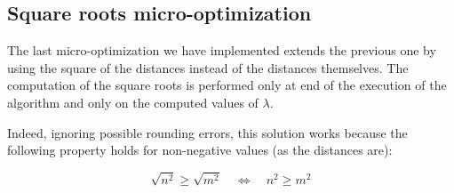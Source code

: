 \documentclass{article}
\begin{document}
\hypertarget{micro-optimization-no-square-root}{%
\subsection{Square roots micro-optimization}\label{micro-optimization-no-square-root}}

The last micro-optimization we have implemented extends the previous one by using the
square of the distances instead of the distances themselves. The computation of the square roots
is performed only at end of the execution of the algorithm and only on the computed values of
$\lambda$.

Indeed, ignoring possible rounding errors, this solution works because the following property
holds for
non-negative values (as the distances are):

\[
\sqrt{n^2} \geq \sqrt{m^2} \quad \iff \quad n^2 \geq m^2
\]
\end{document}
